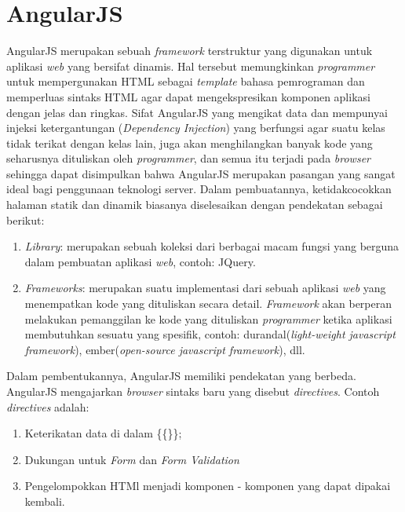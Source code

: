 \section{AngularJS}
\label{sec: angularJS}

AngularJS\cite{AngularJSDocs} merupakan sebuah \textit{framework} terstruktur yang digunakan untuk aplikasi \textit{web} yang bersifat dinamis. Hal tersebut memungkinkan \textit{programmer} untuk mempergunakan HTML sebagai \textit{template} bahasa pemrograman dan memperluas sintaks HTML agar dapat mengekspresikan komponen aplikasi dengan jelas dan ringkas. Sifat AngularJS yang mengikat data dan mempunyai injeksi ketergantungan (\textit{Dependency Injection}) yang berfungsi agar suatu kelas tidak terikat dengan kelas lain, juga akan menghilangkan banyak kode yang seharusnya dituliskan oleh \textit{programmer}, dan semua itu terjadi pada \textit{browser} sehingga dapat disimpulkan bahwa AngularJS merupakan pasangan yang sangat ideal bagi penggunaan teknologi server. 
Dalam pembuatannya, ketidakcocokkan halaman statik dan dinamik biasanya diselesaikan dengan pendekatan sebagai berikut:
\begin{enumerate}
	\item \textit{Library}: merupakan sebuah koleksi dari berbagai macam fungsi yang berguna dalam pembuatan aplikasi \textit{web}, contoh: JQuery.
	\item \textit{Frameworks}: merupakan suatu implementasi dari sebuah aplikasi \textit{web} yang menempatkan kode yang dituliskan secara detail. \textit{Framework} akan berperan melakukan pemanggilan ke kode yang dituliskan \textit{programmer} ketika aplikasi membutuhkan sesuatu yang spesifik, contoh: durandal(\textit{light-weight javascript framework}), ember(\textit{open-source javascript framework}), dll.
\end{enumerate}

Dalam pembentukannya, AngularJS memiliki pendekatan yang berbeda. AngularJS mengajarkan \textit{browser} sintaks baru yang disebut \textit{directives}. Contoh \textit{directives} adalah:
\begin{enumerate}
	\item Keterikatan data di dalam \{\{\}\};
	\item Dukungan untuk \textit{Form} dan \textit{Form Validation}
	\item Pengelompokkan HTMl menjadi komponen - komponen yang dapat dipakai kembali.
\end{enumerate}

